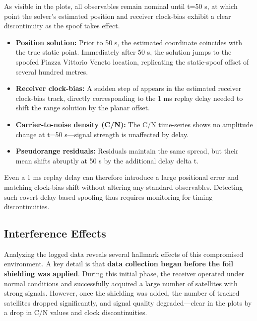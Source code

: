         \noindent As visible in the plots, all observables remain nominal until t=50 s, at which point the solver's estimated position and receiver clock-bias exhibit a clear discontinuity as the spoof takes effect.

        \begin{itemize}
            \item \textbf{Position solution:} Prior to 50 s, the estimated coordinate coincides with the true static point. Immediately after 50 s, the solution jumps to the spoofed Piazza Vittorio Veneto location, replicating the static-spoof offset of several hundred metres.  
            \item \textbf{Receiver clock-bias:} A sudden step of appears in the estimated receiver clock-bias track, directly corresponding to the 1 ms replay delay needed to shift the range solution by the planar offset.  
            \item \textbf{Carrier-to-noise density (C/N):} The C/N time-series shows no amplitude change at t=50 s—signal strength is unaffected by delay.  
            \item \textbf{Pseudorange residuals:} Residuals maintain the same spread, but their mean shifts abruptly at 50 s by the additional delay delta t.  
        \end{itemize}
        
        \noindent Even a 1 ms replay delay can therefore introduce a large positional error and matching clock-bias shift without altering any standard observables. Detecting such covert delay-based spoofing thus requires monitoring for timing discontinuities.

        \subsection{Interference Effects}

        \noindent
        Analyzing the logged data reveals several hallmark effects of this compromised environment. A key detail is that \textbf{data collection began before the foil shielding was applied}. During this initial phase, the receiver operated under normal conditions and successfully acquired a large number of satellites with strong signals. However, once the shielding was added, the number of tracked satellites dropped significantly, and signal quality degraded—clear in the plots by a drop in C/N values and clock discontinuities.
        
